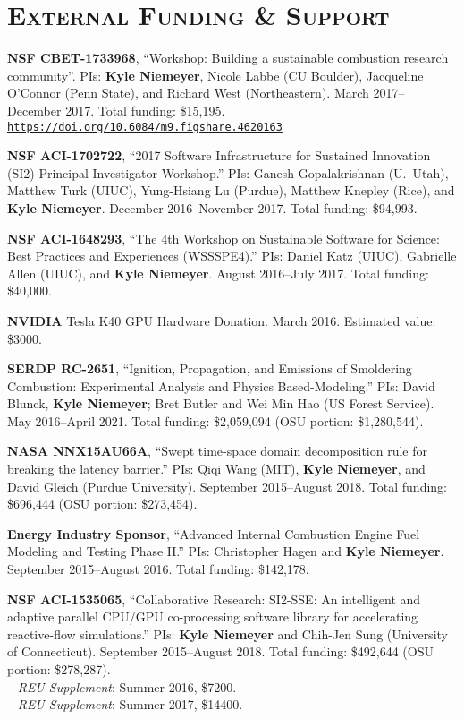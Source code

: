 \documentclass[margin,line,11pt]{res}
\makeatletter
\newlength{\bibhang}
\newlength{\bibsep}
 {\@listi \global\bibsep\itemsep \global\advance\bibsep by\parsep}
\newenvironment{bibenum*}
  {\renewcommand\labelenumi{\theenumi.}%
   \etaremune[
     topsep=0pt,
     itemsep=\bibsep,
     parsep=0pt,partopsep=0pt,
     itemindent=-\bibhang,
     leftmargin={\bibhang+\widthof{[999]}}]}
  {\endetaremune}
\newcommand*{\doi}[1]{\href{https://doi.org/#1}{\nolinkurl{https://doi.org/#1}}}
\makeatother
\begin{document}
\begin{resume}
\begin{bibenum*}
\end{bibenum*}

\section{\textsc{External Funding \& Support}}

\textbf{NSF CBET-1733968}, ``Workshop: Building a sustainable combustion research community''.
PIs: \textbf{Kyle Niemeyer}, Nicole Labbe (CU Boulder), Jacqueline O'Connor (Penn State), and Richard West (Northeastern).
March 2017--December 2017.
Total funding: \$15,195. \\
\doi{10.6084/m9.figshare.4620163}

\textbf{NSF ACI-1702722}, ``2017 Software Infrastructure for Sustained Innovation (SI2) Principal Investigator Workshop.''
PIs: Ganesh Gopalakrishnan (U.~Utah), Matthew Turk (UIUC), Yung-Hsiang Lu (Purdue), Matthew Knepley (Rice), and \textbf{Kyle Niemeyer}.
December 2016--November 2017.
Total funding: \$94,993.

\textbf{NSF ACI-1648293}, ``The 4th Workshop on Sustainable Software for Science: Best Practices and Experiences (WSSSPE4).''
PIs: Daniel Katz (UIUC), Gabrielle Allen (UIUC), and \textbf{Kyle Niemeyer}.
August 2016--July 2017.
Total funding: \$40,000.

\textbf{NVIDIA} Tesla K40 GPU Hardware Donation. March 2016. Estimated value: \$3000.

\textbf{SERDP RC-2651}, ``Ignition, Propagation, and Emissions of Smoldering Combustion: Experimental Analysis and Physics Based-Modeling.'' PIs: David Blunck, \textbf{Kyle Niemeyer}; Bret Butler and Wei Min Hao (US Forest Service). May 2016--April 2021. Total funding: \$2,059,094 (OSU portion: \$1,280,544).

\textbf{NASA NNX15AU66A}, ``Swept time-space domain decomposition rule for breaking the latency barrier.'' PIs: Qiqi Wang (MIT), \textbf{Kyle Niemeyer}, and David Gleich (Purdue University). September 2015--August 2018. Total funding: \$696,444 (OSU portion: \$273,454).

\textbf{Energy Industry Sponsor}, ``Advanced Internal Combustion Engine Fuel Modeling and Testing Phase II.'' PIs: Christopher Hagen and \textbf{Kyle Niemeyer}. September 2015--August 2016. Total funding: \$142,178.

\textbf{NSF ACI-1535065}, ``Collaborative Research: SI2-SSE: An intelligent and adaptive parallel CPU\slash GPU co-processing software library for accelerating reactive-flow simulations.''
PIs: \textbf{Kyle Niemeyer} and Chih-Jen Sung (University of Connecticut).
September 2015--August 2018. Total funding: \$492,644 (OSU portion: \$278,287). \\
-- \textit{REU Supplement}: Summer 2016, \$7200. \\
-- \textit{REU Supplement}: Summer 2017, \$14400.


\end{resume}
\end{document}
